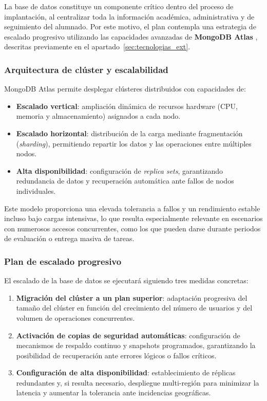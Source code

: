 La base de datos constituye un componente crítico dentro del proceso de implantación, al centralizar toda la información académica, administrativa y de seguimiento del alumnado. Por este motivo, el plan contempla una estrategia de escalado progresivo utilizando las capacidades avanzadas de \textbf{MongoDB Atlas} \cite{mongodb_atlas_docs}, descritas previamente en el apartado~\ref{sec:tecnologias_ext}.

\subsubsection{Arquitectura de clúster y escalabilidad}

MongoDB Atlas permite desplegar clústeres distribuidos con capacidades de:

\begin{itemize}
    \item \textbf{Escalado vertical}: ampliación dinámica de recursos hardware (CPU, memoria y almacenamiento) asignados a cada nodo.
    
    \item \textbf{Escalado horizontal}: distribución de la carga mediante fragmentación (\textit{sharding}), permitiendo repartir los datos y las operaciones entre múltiples nodos.
    
    \item \textbf{Alta disponibilidad}: configuración de \textit{replica sets}, garantizando redundancia de datos y recuperación automática ante fallos de nodos individuales.
\end{itemize}

Este modelo proporciona una elevada tolerancia a fallos y un rendimiento estable incluso bajo cargas intensivas, lo que resulta especialmente relevante en escenarios con numerosos accesos concurrentes, como los que pueden darse durante periodos de evaluación o entrega masiva de tareas.

\subsubsection{Plan de escalado progresivo}

El escalado de la base de datos se ejecutará siguiendo tres medidas concretas:

\begin{enumerate}
    \item \textbf{Migración del clúster a un plan superior}: adaptación progresiva del tamaño del clúster en función del crecimiento del número de usuarios y del volumen de operaciones concurrentes.
    
    \item \textbf{Activación de copias de seguridad automáticas}: configuración de mecanismos de respaldo continuo y snapshots programados, garantizando la posibilidad de recuperación ante errores lógicos o fallos críticos.
    
    \item \textbf{Configuración de alta disponibilidad}: establecimiento de réplicas redundantes y, si resulta necesario, despliegue multi-región para minimizar la latencia y aumentar la tolerancia ante incidencias geográficas.
\end{enumerate}

